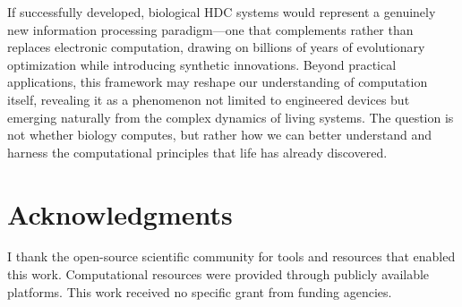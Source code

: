 \documentclass[12pt]{article}
\begin{document}
If successfully developed, biological HDC systems would represent a genuinely new information processing paradigm—one that complements rather than replaces electronic computation, drawing on billions of years of evolutionary optimization while introducing synthetic innovations. Beyond practical applications, this framework may reshape our understanding of computation itself, revealing it as a phenomenon not limited to engineered devices but emerging naturally from the complex dynamics of living systems. The question is not whether biology computes, but rather how we can better understand and harness the computational principles that life has already discovered.

\section*{Acknowledgments}

I thank the open-source scientific community for tools and resources that enabled this work. Computational resources were provided through publicly available platforms. This work received no specific grant from funding agencies.
\end{document}

